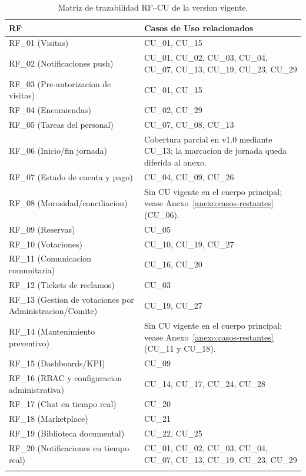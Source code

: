 \begin{longtable}{|m{3cm}|m{12.5cm}|}
\hline
\textbf{RF} & \textbf{Casos de Uso relacionados} \\\hline
RF\_01 (Visitas) & CU\_01, CU\_15 \\\hline
RF\_02 (Notificaciones push) & CU\_01, CU\_02, CU\_03, CU\_04, CU\_07, CU\_13, CU\_19, CU\_23, CU\_29 \\\hline
RF\_03 (Pre-autorizacion de visitas) & CU\_01, CU\_15 \\\hline
RF\_04 (Encomiendas) & CU\_02, CU\_29 \\\hline
RF\_05 (Tareas del personal) & CU\_07, CU\_08, CU\_13 \\\hline
RF\_06 (Inicio/fin jornada) & Cobertura parcial en v1.0 mediante CU\_13; la marcacion de jornada queda diferida al anexo. \\\hline
RF\_07 (Estado de cuenta y pago) & CU\_04, CU\_09, CU\_26 \\\hline
RF\_08 (Morosidad/conciliacion) & Sin CU vigente en el cuerpo principal; vease Anexo~\ref{anexo:casos-restantes} (CU\_06). \\\hline
RF\_09 (Reservas) & CU\_05 \\\hline
RF\_10 (Votaciones) & CU\_10, CU\_19, CU\_27 \\\hline
RF\_11 (Comunicacion comunitaria) & CU\_16, CU\_20 \\\hline
RF\_12 (Tickets de reclamos) & CU\_03 \\\hline
RF\_13 (Gestion de votaciones por Administracion/Comite) & CU\_19, CU\_27 \\\hline
RF\_14 (Mantenimiento preventivo) & Sin CU vigente en el cuerpo principal; vease Anexo~\ref{anexo:casos-restantes} (CU\_11 y CU\_18). \\\hline
RF\_15 (Dashboards/KPI) & CU\_09 \\\hline
RF\_16 (RBAC y configuracion administrativa) & CU\_14, CU\_17, CU\_24, CU\_28 \\\hline
RF\_17 (Chat en tiempo real) & CU\_20 \\\hline
RF\_18 (Marketplace) & CU\_21 \\\hline
RF\_19 (Biblioteca documental) & CU\_22, CU\_25 \\\hline
RF\_20 (Notificaciones en tiempo real) & CU\_01, CU\_02, CU\_03, CU\_04, CU\_07, CU\_13, CU\_19, CU\_23, CU\_29 \\\hline
\caption{Matriz de trazabilidad RF--CU de la version vigente.}
\label{tab:traza-compacta}
\end{longtable}

